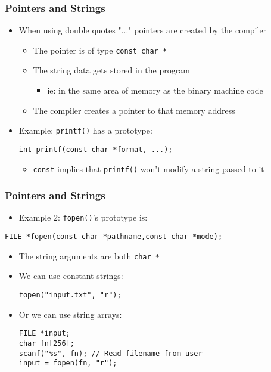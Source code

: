 \documentclass[14pt]{beamer}
\begin{document}
\begin{frame}[fragile]
\frametitle{Pointers and Strings}
\begin{itemize}
\item When using double quotes "..." pointers are created by the compiler
	\begin{itemize}
		\item The pointer is of type \texttt{const char *}
		\item The string data gets stored in the program
			\begin{itemize}
				\item ie: in the same area of memory as the binary machine code
			\end{itemize}
		\item The compiler creates a pointer to that memory address
	\end{itemize}
\item Example: \texttt{printf()} has a prototype:
\begin{lstlisting}[style=CStyle]
int printf(const char *format, ...);
\end{lstlisting}
	\begin{itemize}
		\item \texttt{const} implies that \texttt{printf()} won't modify a string passed to it
	\end{itemize}
\end{itemize}
\end{frame}

\begin{frame}[fragile]
\frametitle{Pointers and Strings}
\begin{itemize}
\item Example 2: \texttt{fopen()}'s prototype is:
\end{itemize}
\begin{lstlisting}[style=CStyle]
FILE *fopen(const char *pathname,const char *mode);
\end{lstlisting}
\begin{itemize}
\item The string arguments are both \texttt{char *}
\item We can use constant strings:
\begin{lstlisting}[style=CStyle]
fopen("input.txt", "r");
\end{lstlisting}
\item Or we can use string arrays:
\begin{lstlisting}[style=CStyle]
FILE *input;
char fn[256];
scanf("%s", fn); // Read filename from user
input = fopen(fn, "r");
\end{lstlisting}
\end{itemize}
\end{frame}
\end{document}
